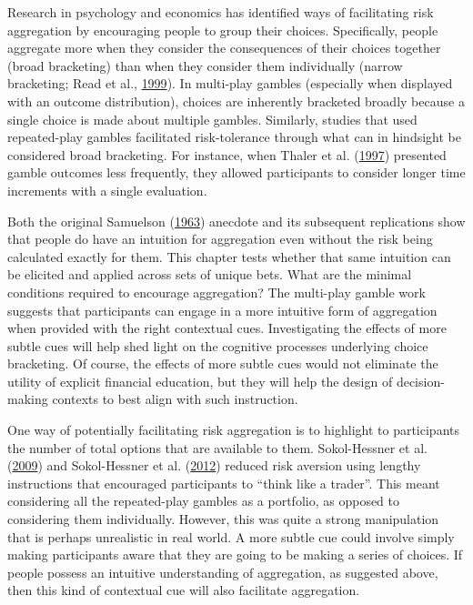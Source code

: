 \documentclass[
  english,
  man, donotrepeattitle,floatsintext]{apa7}
\theoremstyle{definition}
\theoremstyle{definition}
\theoremstyle{definition}
\theoremstyle{definition}
\theoremstyle{remark}
\begin{document}
Research in psychology and economics has identified ways of facilitating risk
aggregation by encouraging people to group their choices. Specifically, people
aggregate more when they consider the consequences of their choices together
(broad bracketing) than when they consider them individually (narrow
bracketing; Read et al., \protect\hyperlink{ref-read1999}{1999}). In multi-play gambles (especially when displayed with
an outcome distribution), choices are inherently bracketed broadly because a
single choice is made about multiple gambles. Similarly, studies that used
repeated-play gambles facilitated risk-tolerance through what can in hindsight
be considered broad bracketing. For instance, when Thaler et al. (\protect\hyperlink{ref-thaler1997}{1997}) presented gamble
outcomes less frequently, they allowed participants to consider longer time
increments with a single evaluation.

Both the original Samuelson (\protect\hyperlink{ref-samuelson1963}{1963}) anecdote and its subsequent replications show
that people do have an intuition for aggregation even without the risk being
calculated exactly for them. This chapter tests whether that same intuition can
be elicited and applied across sets of unique bets. What are the minimal
conditions required to encourage aggregation? The multi-play gamble work
suggests that participants can engage in a more intuitive form of aggregation
when provided with the right contextual cues. Investigating the effects of more
subtle cues will help shed light on the cognitive processes underlying choice
bracketing. Of course, the effects of more subtle cues would not eliminate the
utility of explicit financial education, but they will help the design of
decision-making contexts to best align with such instruction.

One way of potentially facilitating risk aggregation is to highlight to
participants the number of total options that are available to them.
Sokol-Hessner et al. (\protect\hyperlink{ref-sokolhessner2009}{2009}) and Sokol-Hessner et al. (\protect\hyperlink{ref-sokolhessner2012}{2012}) reduced risk aversion using lengthy
instructions that encouraged participants to ``think like a trader''. This meant
considering all the repeated-play gambles as a portfolio, as opposed to
considering them individually. However, this was quite a strong manipulation
that is perhaps unrealistic in real world. A more subtle cue could involve
simply making participants aware that they are going to be making a series of
choices. If people possess an intuitive understanding of aggregation, as
suggested above, then this kind of contextual cue will also facilitate
aggregation.
\end{document}
